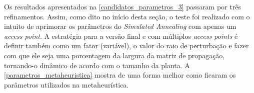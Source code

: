 \documentclass[
	12pt,				%
	twoside,			%
	a4paper,			%
	english,			%
	french,				%
	spanish,			%
	brazil				%
	]{abntex2}
\begin{document}
\begin{table}[ht]
    \centering
    \caption{Candidatos a parâmetros na terceira iteração.}
    \label{candidatos_parametros_3}
\end{table}

Os resultados apresentados na \autoref{candidatos_parametros_3} passaram
por três refinamentos. Assim, como dito no início desta seção, o teste
foi realizado com o intuito de aprimorar os parâmetros do
\emph{Simulated Annealing} com apenas um \emph{access point}. A
estratégia para a versão final e com múltiplos \emph{access points} é
definir também como um fator (variável), o valor do raio de perturbação
e fazer com que ele seja uma porcentagem da largura da matriz de
propagação, tornando-o dinâmico de acordo com o tamanho da planta. A
\autoref{parametros_metaheuristica} mostra de uma forma melhor como
ficaram os parâmetros utilizados na metaheurística.
\end{document}
